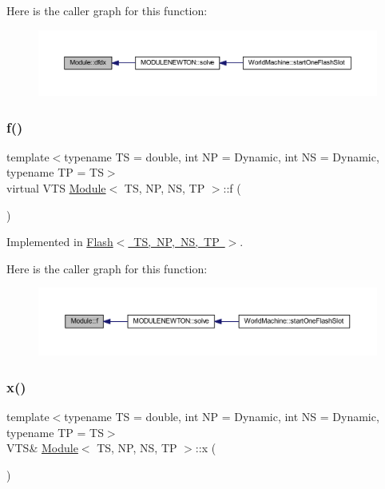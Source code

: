 Here is the caller graph for this function\+:\nopagebreak
\begin{figure}[H]
\begin{center}
\leavevmode
\includegraphics[width=350pt]{class_module_a0762d7cbad2a73d5eff3f2f1155e8e33_icgraph}
\end{center}
\end{figure}
\mbox{\label{class_module_a2499211a4fc52bc33512761ea7fb3c62}} 
\subsubsection{\texorpdfstring{f()}{f()}}
{\footnotesize\ttfamily template$<$typename TS = double, int NP = Dynamic, int NS = Dynamic, typename TP = TS$>$ \\
virtual V\+TS \mbox{\hyperlink{class_module}{Module}}$<$ TS, NP, NS, TP $>$\+::f (\begin{DoxyParamCaption}{ }\end{DoxyParamCaption})\hspace{0.3cm}{\ttfamily [pure virtual]}}



Implemented in \mbox{\hyperlink{class_flash_ad29e755877ca96aa5b9f34a10d6cd8b2}{Flash$<$ T\+S, N\+P, N\+S, T\+P $>$}}.

Here is the caller graph for this function\+:\nopagebreak
\begin{figure}[H]
\begin{center}
\leavevmode
\includegraphics[width=350pt]{class_module_a2499211a4fc52bc33512761ea7fb3c62_icgraph}
\end{center}
\end{figure}
\mbox{\label{class_module_a923f4a0593063f6df53e165cc1db4891}} 
\subsubsection{\texorpdfstring{x()}{x()}\hspace{0.1cm}{\footnotesize\ttfamily [1/2]}}
{\footnotesize\ttfamily template$<$typename TS = double, int NP = Dynamic, int NS = Dynamic, typename TP = TS$>$ \\
V\+TS\& \mbox{\hyperlink{class_module}{Module}}$<$ TS, NP, NS, TP $>$\+::x (\begin{DoxyParamCaption}{ }\end{DoxyParamCaption})\hspace{0.3cm}{\ttfamily [inline]}}

